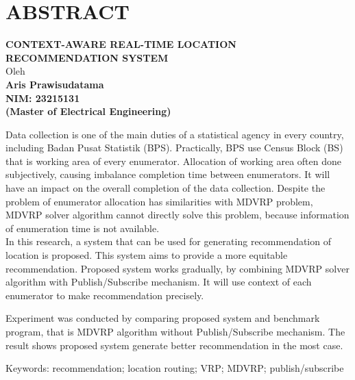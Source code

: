 %
%
%

\chapter*{ABSTRACT}

\vspace*{0.2cm}

\begin{center}
	{\large \textbf{CONTEXT-AWARE REAL-TIME LOCATION RECOMMENDATION SYSTEM}} \\
	\vspace*{0.2cm}
	Oleh \\
	{\large \textbf{Aris Prawisudatama}} \\
	{\large \textbf{NIM: 23215131}} \\
	{\large \textbf{(Master of Electrical Engineering)}}
\end{center}

\vspace*{0.5cm}

\noindent Data collection is one of the main duties of a statistical agency in every country, including Badan Pusat Statistik (BPS). Practically, BPS use Census Block (BS) that is working area of every enumerator. Allocation of working area often done subjectively, causing imbalance completion time between enumerators. It will have an impact on the overall completion of the data collection. Despite the problem of enumerator allocation has similarities with MDVRP problem, MDVRP solver algorithm cannot directly solve this problem, because information of enumeration time is not available. \\

\noindent In this research, a system that can be used for generating recommendation of location is proposed. This system aims to provide a more equitable recommendation. Proposed system works gradually, by combining MDVRP solver algorithm with Publish/Subscribe mechanism. It will use context of each enumerator to make recommendation precisely.

\noindent Experiment was conducted by comparing proposed system and benchmark program, that is MDVRP algorithm without Publish/Subscribe mechanism. The result shows proposed system generate better recommendation in the most case.

\vspace*{0.2cm}

\noindent Keywords: recommendation; location routing; VRP; MDVRP; publish/subscribe \\

\newpage